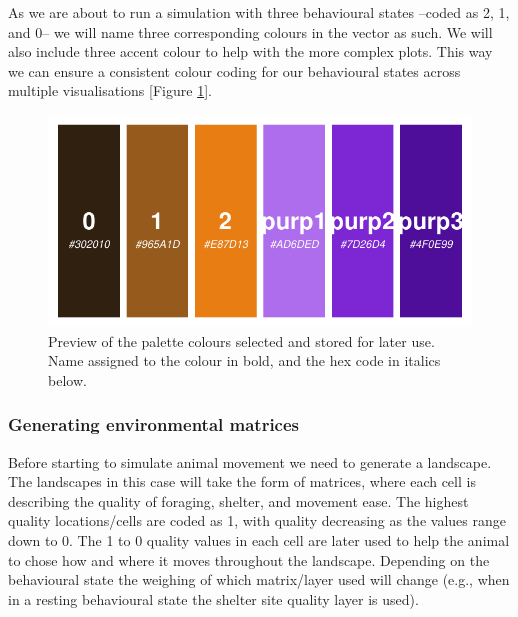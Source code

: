 \documentclass[10pt,a4paper]{article}
\begin{document}
As we are about to run a simulation with three behavioural states --coded as 2, 1, and 0-- we will name three corresponding colours in the vector as such.
We will also include three accent colour to help with the more complex plots.
This way we can ensure a consistent colour coding for our behavioural states across multiple visualisations {[}Figure \ref{fig:palettePreview}{]}.

\begin{figure}

{\centering \includegraphics{Agent-based_model_walkthrough_files/figure-latex/palettePreview-1} 

}

\caption{Preview of the palette colours selected and stored for later use. Name assigned to the colour in bold, and the hex code in italics below.}\label{fig:palettePreview}
\end{figure}

\hypertarget{generating-environmental-matrices}{%
\subsubsection{Generating environmental matrices}\label{generating-environmental-matrices}}

Before starting to simulate animal movement we need to generate a landscape.
The landscapes in this case will take the form of matrices, where each cell is describing the quality of foraging, shelter, and movement ease.
The highest quality locations/cells are coded as 1, with quality decreasing as the values range down to 0.
The 1 to 0 quality values in each cell are later used to help the animal to chose how and where it moves throughout the landscape.
Depending on the behavioural state the weighing of which matrix/layer used will change (e.g., when in a resting behavioural state the shelter site quality layer is used).
\end{document}
